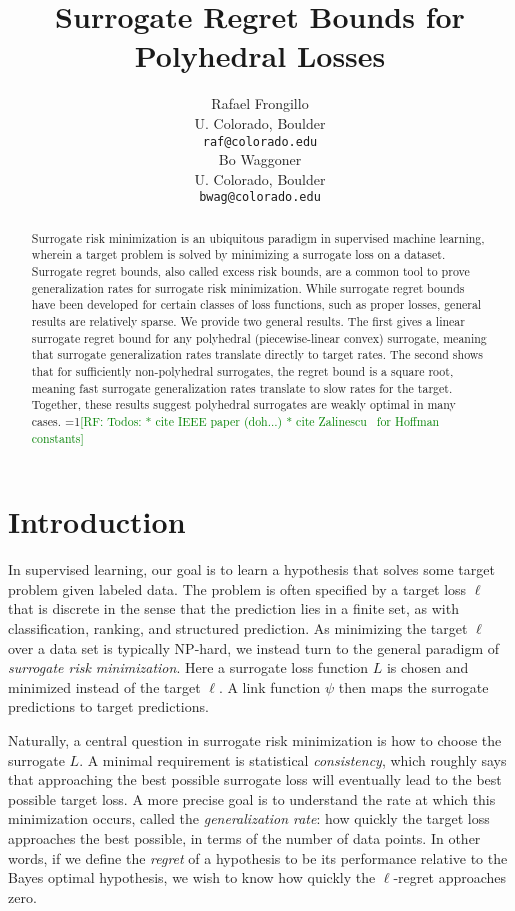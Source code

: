 \documentclass{article}
\title{Surrogate Regret Bounds for Polyhedral Losses}
\author{%
  Rafael Frongillo \\
  U. Colorado, Boulder \\
  \texttt{raf@colorado.edu} \\
  \And
  Bo Waggoner \\
  U. Colorado, Boulder \\
  \texttt{bwag@colorado.edu}
}
\theoremstyle{definition}\newtheorem{definition}{Definition}
\theoremstyle{definition}\newtheorem{assumption}{Assumption}
\newcommand{\Comments}{0}
\newcommand{\mynote}[2]{\ifnum\Comments=1\textcolor{#1}{#2}\fi}
\newcommand{\raf}[1]{\mynote{green}{[RF: #1]}}
\begin{document}
\maketitle

\begin{abstract}
  Surrogate risk minimization is an ubiquitous paradigm in supervised machine learning, wherein a target problem is solved by minimizing a surrogate loss on a dataset.
  Surrogate regret bounds, also called excess risk bounds, are a common tool to prove generalization rates for surrogate risk minimization.
  While surrogate regret bounds have been developed for certain classes of loss functions, such as proper losses, general results are relatively sparse.
  We provide two general results.
  The first gives a linear surrogate regret bound for any polyhedral (piecewise-linear convex) surrogate, meaning that surrogate generalization rates translate directly to target rates.
  The second shows that for sufficiently non-polyhedral surrogates, the regret bound is a square root, meaning fast surrogate generalization rates translate to slow rates for the target.
  Together, these results suggest polyhedral surrogates are weakly optimal in many cases.
  \raf{Todos:
    * cite IEEE paper (doh...)
    * cite Zalinescu~\cite{zalinescu2003sharp} for Hoffman constants}
\end{abstract}

\section{Introduction}
In supervised learning, our goal is to learn a hypothesis that solves some target problem given labeled data.
The problem is often specified by a target loss $\ell$ that is discrete in the sense that the prediction lies in a finite set, as with classification, ranking, and structured prediction.
As minimizing the target $\ell$ over a data set is typically NP-hard, we instead turn to the general paradigm of \emph{surrogate risk minimization}.
Here a surrogate loss function $L$ is chosen and minimized instead of the target $\ell$.
A link function $\psi$ then maps the surrogate predictions to target predictions.

Naturally, a central question in surrogate risk minimization is how to choose the surrogate $L$.
A minimal requirement is statistical \emph{consistency}, which roughly says that approaching the best possible surrogate loss will eventually lead to the best possible target loss.
A more precise goal is to understand the rate at which this minimization occurs, called the \emph{generalization rate}: how quickly the target loss approaches the best possible, in terms of the number of data points.
In other words, if we define the \emph{regret} of a hypothesis to be its performance relative to the Bayes optimal hypothesis, we wish to know how quickly the $\ell$-regret approaches zero.
\end{document}
